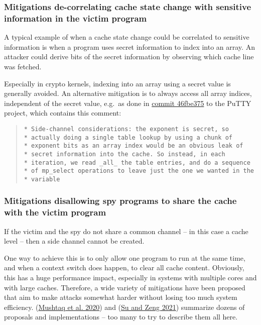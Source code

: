\documentclass[
  a4paper,
]{report}
\begin{document}
\hypertarget{mitigations-de-correlating-cache-state-change-with-sensitive-information-in-the-victim-program}{%
\subsubsection{Mitigations de-correlating cache state change with
sensitive information in the victim
program}\label{mitigations-de-correlating-cache-state-change-with-sensitive-information-in-the-victim-program}}

A typical example of when a cache state change could be correlated to
sensitive information is when a program uses secret information to index
into an array. An attacker could derive bits of the secret information
by observing which cache line was fetched.

Especially in crypto kernels, indexing into an array using a secret
value is generally avoided. An alternative mitigation is to always
access all array indices, independent of the secret value, e.g.~as done
in
\href{https://git.tartarus.org/?p=simon/putty.git;a=commitdiff;h=46fbe375bf}{commit
46fbe375} to the PuTTY project, which contains this comment:

\begin{quote}
\begin{verbatim}
* Side-channel considerations: the exponent is secret, so
* actually doing a single table lookup by using a chunk of
* exponent bits as an array index would be an obvious leak of
* secret information into the cache. So instead, in each
* iteration, we read _all_ the table entries, and do a sequence
* of mp_select operations to leave just the one we wanted in the
* variable
\end{verbatim}
\end{quote}

\hypertarget{mitigations-disallowing-spy-programs-to-share-the-cache-with-the-victim-program}{%
\subsubsection{Mitigations disallowing spy programs to share the cache
with the victim
program}\label{mitigations-disallowing-spy-programs-to-share-the-cache-with-the-victim-program}}

If the victim and the spy do not share a common channel -- in this case
a cache level -- then a side channel cannot be created.

One way to achieve this is to only allow one program to run at the same
time, and when a context switch does happen, to clear all cache content.
Obviously, this has a huge performance impact, especially in systems
with multiple cores and with large caches. Therefore, a wide variety of
mitigations have been proposed that aim to make attacks somewhat harder
without losing too much system efficiency.
(\protect\hyperlink{ref-Mushtaq2020}{Mushtaq et al. 2020}) and
(\protect\hyperlink{ref-Su2021}{Su and Zeng 2021}) summarize dozens of
proposals and implementations -- too many to try to describe them all
here.
\end{document}
